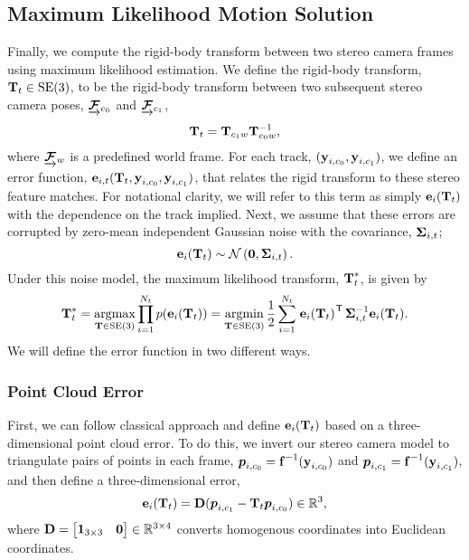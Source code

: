 \subsection{Maximum Likelihood Motion Solution}
Finally, we compute the rigid-body transform between two stereo camera frames using maximum likelihood estimation. We define the rigid-body transform, $\boldsymbol{\mathbf{T}}_t \in\text{SE}(3)$, to be the rigid-body transform between two subsequent stereo camera poses, 
$\underrightarrow{ \boldsymbol{\mathbf{\mathcal{F}}} }_{c_0}$ and  $\underrightarrow{ \boldsymbol{\mathbf{\mathcal{F}}} }_{c_1}$, 
\begin{equation}
	\boldsymbol{\mathbf{T}}_t = \boldsymbol{\mathbf{T}}_{c_1w} \boldsymbol{\mathbf{T}}^{-1}_{c_0w},
\end{equation}
where $\underrightarrow{ \boldsymbol{\mathbf{\mathcal{F}}} }_{w}$ is a predefined world frame. For each track, $(\boldsymbol{\mathbf{y}}_{i, c_0}, \boldsymbol{\mathbf{y}}_{i, c_1})$, we define an error function, $\boldsymbol{\mathbf{e}}_{i,t}(\boldsymbol{\mathbf{T}}_t, \boldsymbol{\mathbf{y}}_{i, c_0}, \boldsymbol{\mathbf{y}}_{i, c_1})$, that relates the rigid transform to these stereo feature matches. For notational clarity, we will refer to this term as simply $\boldsymbol{\mathbf{e}}_{i}(\boldsymbol{\mathbf{T}}_t)$ with the dependence on the track implied. Next, we assume that these errors are corrupted by zero-mean independent Gaussian noise with the covariance, $\boldsymbol{\mathbf{\Sigma}}_{i,t}$;
 \begin{equation}
  \boldsymbol{\mathbf{e}}_{i}(\boldsymbol{\mathbf{T}}_t) \sim
 \mathcal{N}\left(\boldsymbol{\mathbf{0}}, \boldsymbol{\mathbf{\Sigma}}_{i,t}\right). 
\end{equation}
Under this noise model, the maximum likelihood transform, $\boldsymbol{\mathbf{T}}^*_t$, is given by 
\begin{equation}
\label{eq:vo_objective}
  \boldsymbol{\mathbf{T}}_t^* = \operatorname*{argmax}_{\boldsymbol{\mathbf{T}}\in\text{SE}(3)}\prod_{i=1}^{N_t} p(\boldsymbol{\mathbf{e}}_{i}(\boldsymbol{\mathbf{T}}_t)) = \operatorname*{argmin}_{\boldsymbol{\mathbf{T}}\in\text{SE}(3)} \frac{1}{2} \sum_{i=1}^{N_t} 
  \left.{\boldsymbol{\mathbf{e}}_{i}(\boldsymbol{\mathbf{T}}_t)}\right.^{\mkern-1.0mu\mathsf{T}} \boldsymbol{\mathbf{\Sigma}}_{i,t}^{-1} \boldsymbol{\mathbf{e}}_{i}(\boldsymbol{\mathbf{T}}_t).
\end{equation}
We will define the error function in two different ways.

\subsubsection{Point Cloud Error}
\label{sec:vo_point_cloud}
First, we can follow classical approach \citep{Maimone2007-tc} and define $ \boldsymbol{\mathbf{e}}_{i}(\boldsymbol{\mathbf{T}}_t) $ based on a three-dimensional point cloud error. To do this, we invert our stereo camera model to triangulate pairs of points in each frame, $\boldsymbol{p}_{i,c_0} = \boldsymbol{\mathbf{f}}^{-1}(\boldsymbol{\mathbf{y}}_{i, c_0})$ and $\boldsymbol{p}_{i,c_1} = \boldsymbol{\mathbf{f}}^{-1}(\boldsymbol{\mathbf{y}}_{i, c_1})$, and then define a three-dimensional error,
\begin{align}
	 \boldsymbol{\mathbf{e}}_{i}(\boldsymbol{\mathbf{T}}_t) = \boldsymbol{\mathbf{D}}(\boldsymbol{p}_{i,c_1} - \boldsymbol{\mathbf{T}}_t \boldsymbol{p}_{i,c_0}) \in \mathbb{R}{}^3,
\end{align}
where $\boldsymbol{\mathbf{D}} = \begin{bmatrix} \boldsymbol{\mathbf{1}}_{3\times3} & \boldsymbol{\mathbf{0}} \end{bmatrix} \in \mathbb{R}{}^{3\times4}$ converts homogenous coordinates into Euclidean coordinates.

